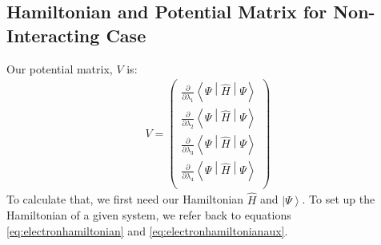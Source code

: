 \documentclass{aux/ttuthes2007}
\newcommand{\ket}[1]{\ensuremath{\left|#1\right\rangle}}
\newcommand{\sandwich}[3]{\left< #1 \middle\vert #2 \middle\vert #3 \right>}
\newcommand{\pd}[1]{\frac{\partial}{\partial #1}}
\begin{document}
\subsection[\textbf{Hamiltonian and Potential Matrix for \texorpdfstring{\\}{} Non-Interacting Case}]{\textbf{Hamiltonian and Potential Matrix for Non-Interacting Case}}

Our potential matrix, $V$ is:
%
\begin{equation*}
	\begin{split}
		V = \begin{pmatrix}
			\pd {\lambda_1} \sandwich {\Psi}{\hat H}{\Psi}\\
			\pd {\lambda_2} \sandwich {\Psi}{\hat H}{\Psi}\\
			\pd {\lambda_3} \sandwich {\Psi}{\hat H}{\Psi}\\
			\pd {\lambda_4} \sandwich {\Psi}{\hat H}{\Psi}\\
		\end{pmatrix}
	\end{split}
\end{equation*}
%
To calculate that, we first need our Hamiltonian $\hat H$ and $\ket \Psi$. To set up the Hamiltonian of a given system, we refer back to equations \ref{eq:electronhamiltonian} and \ref{eq:electronhamiltonianaux}. 
\end{document}
